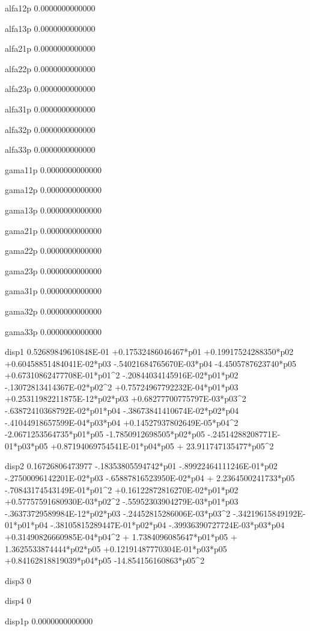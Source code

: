  alfa12p
   0.0000000000000 
  
 alfa13p
   0.0000000000000 
  
 alfa21p
   0.0000000000000 
  
 alfa22p
   0.0000000000000 
  
 alfa23p
   0.0000000000000 
  
 alfa31p
   0.0000000000000 
  
 alfa32p
   0.0000000000000 
  
 alfa33p
   0.0000000000000 
  
 gama11p
   0.0000000000000 
  
 gama12p
   0.0000000000000 
  
 gama13p
   0.0000000000000 
  
 gama21p
   0.0000000000000 
  
 gama22p
   0.0000000000000 
  
 gama23p
   0.0000000000000 
  
 gama31p
   0.0000000000000 
  
 gama32p
   0.0000000000000 
  
 gama33p
   0.0000000000000 
  
 disp1  
  0.52689849610848E-01 +0.17532486046467*p01 +0.19917524288350*p02 +0.60458851484041E-02*p03  -.54021684765670E-03*p04  -4.4505787623740*p05 +0.67310862477708E-01*p01^2  -.20844034145916E-02*p01*p02  -.13072813414367E-02*p02^2 +0.75724967792232E-04*p01*p03 +0.25311982211875E-12*p02*p03 +0.68277700775797E-03*p03^2  -.63872410368792E-02*p01*p04  -.38673841410674E-02*p02*p04  -.41044918657599E-04*p03*p04 +0.14527937802649E-05*p04^2  -2.0671253564735*p01*p05  -1.7850912698505*p02*p05  -.24514288208771E-01*p03*p05 +0.87194069754541E-01*p04*p05 + 23.911747135477*p05^2 
  
 disp2  
  0.16726806473977  -.18353805594742*p01  -.89922464111246E-01*p02  -.27500096142201E-02*p03  -.65887816523950E-02*p04 + 2.2364500241733*p05  -.70843174543149E-01*p01^2 +0.16122872816270E-02*p01*p02 +0.57757591680930E-03*p02^2  -.55952303904279E-03*p01*p03  -.36373729589984E-12*p02*p03  -.24452815286006E-03*p03^2  -.34219615849192E-01*p01*p04  -.38105815289447E-01*p02*p04  -.39936390727724E-03*p03*p04 +0.31490826660985E-04*p04^2 + 1.7384096085647*p01*p05 + 1.3625533874444*p02*p05 +0.12191487770304E-01*p03*p05 +0.84162818819039*p04*p05  -14.854156160863*p05^2 
  
 disp3  
 0 
  
 disp4  
 0 
  
 disp1p 
   0.0000000000000 
  
